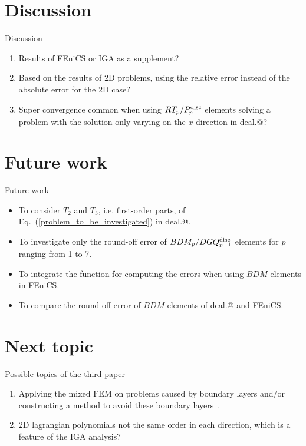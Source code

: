 \documentclass{beamer}
\makeatletter
\newcommand*{\rom}[1]{\expandafter\@slowromancap\romannumeral #1@}
\makeatother
\begin{document}
\section{Discussion}
\begin{frame}{Discussion}
\vspace{-9em}
\begin{enumerate}
 \item Results of FEniCS or IGA as a supplement?
 \item Based on the results of 2D problems, using the relative error instead of the absolute error for the 2D case? 
 \item Super convergence common when using $RT_p/P_{p}^{\rm disc}$ elements solving a problem with the solution only varying on the $x$ direction in deal.\rom{2}?
\end{enumerate}
\end{frame}


\section{Future work}
\begin{frame}{Future work}
\vspace{-8em}
\begin{itemize}
 \item To consider $T_2$ and $T_3$, i.e. first-order parts, of Eq.~(\ref{problem_to_be_investigated}) in deal.\rom{2}.
 \item To investigate only the round-off error of $BDM_p/DGQ_{p-1}^{\rm disc}$ elements for $p$ ranging from 1 to 7.
 \item To integrate the function for computing the errors when using $BDM$ elements in FEniCS.
 \item To compare the round-off error of $BDM$ elements of deal.\rom{2} and FEniCS.
\end{itemize}
\end{frame}

\section{Next topic}
\begin{frame}{Possible topics of the third paper}
\vspace{-11em}
\begin{enumerate}
 \item Applying the mixed FEM on problems caused by boundary layers and/or constructing a method to avoid these boundary layers~\cite{kumar2016three}.
 \item 2D lagrangian polynomials not the same order in each direction, which is a feature of the IGA analysis?
\end{enumerate}
\end{frame}



\end{document}
